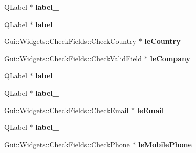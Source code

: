 \begin{DoxyCompactItemize}
\item 
\hypertarget{classUi__DialogAddCustomer_a601f7daf4c6aa0d41f0d09bab5d5c06c}{Q\-Label $\ast$ {\bfseries label\-\_}}\label{classUi__DialogAddCustomer_a601f7daf4c6aa0d41f0d09bab5d5c06c}

\item 
\hypertarget{classUi__DialogAddCustomer_a1098d3aa23de1628bbf59ad51e44f8af}{Q\-Label $\ast$ {\bfseries label\-\_}}\label{classUi__DialogAddCustomer_a1098d3aa23de1628bbf59ad51e44f8af}

\item 
\hypertarget{classUi__DialogAddCustomer_a94019fa00a8d16210540ab9f96622eab}{\hyperlink{classGui_1_1Widgets_1_1CheckFields_1_1CheckCountry}{Gui\-::\-Widgets\-::\-Check\-Fields\-::\-Check\-Country} $\ast$ {\bfseries le\-Country}}\label{classUi__DialogAddCustomer_a94019fa00a8d16210540ab9f96622eab}

\item 
\hypertarget{classUi__DialogAddCustomer_a01be5f083b179a1570804c57d0a7e46e}{\hyperlink{classGui_1_1Widgets_1_1CheckFields_1_1CheckValidField}{Gui\-::\-Widgets\-::\-Check\-Fields\-::\-Check\-Valid\-Field} $\ast$ {\bfseries le\-Company}}\label{classUi__DialogAddCustomer_a01be5f083b179a1570804c57d0a7e46e}

\item 
\hypertarget{classUi__DialogAddCustomer_a16b504f3e35c56dbc17b974505871c81}{Q\-Label $\ast$ {\bfseries label\-\_}}\label{classUi__DialogAddCustomer_a16b504f3e35c56dbc17b974505871c81}

\item 
\hypertarget{classUi__DialogAddCustomer_afeee0063483daa796f74460700570d71}{Q\-Label $\ast$ {\bfseries label\-\_}}\label{classUi__DialogAddCustomer_afeee0063483daa796f74460700570d71}

\item 
\hypertarget{classUi__DialogAddCustomer_aaafcb228ca7aba2bdaa20789d5194061}{\hyperlink{classGui_1_1Widgets_1_1CheckFields_1_1CheckEmail}{Gui\-::\-Widgets\-::\-Check\-Fields\-::\-Check\-Email} $\ast$ {\bfseries le\-Email}}\label{classUi__DialogAddCustomer_aaafcb228ca7aba2bdaa20789d5194061}

\item 
\hypertarget{classUi__DialogAddCustomer_aa251847389275c6466e528d6e94bd1f4}{Q\-Label $\ast$ {\bfseries label\-\_}}\label{classUi__DialogAddCustomer_aa251847389275c6466e528d6e94bd1f4}

\item 
\hypertarget{classUi__DialogAddCustomer_a0983d0b698883a869edaf71053357285}{\hyperlink{classGui_1_1Widgets_1_1CheckFields_1_1CheckPhone}{Gui\-::\-Widgets\-::\-Check\-Fields\-::\-Check\-Phone} $\ast$ {\bfseries le\-Mobile\-Phone}}\label{classUi__DialogAddCustomer_a0983d0b698883a869edaf71053357285}


\end{DoxyCompactItemize}
